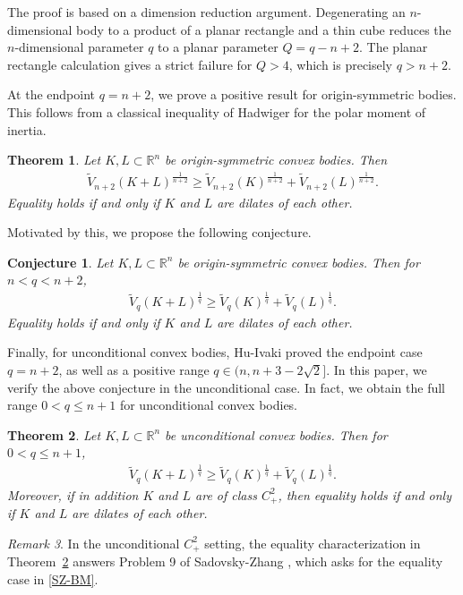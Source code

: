 \documentclass[12pt,leqno]{amsart}
\theoremstyle{plain} \newtheorem{thm}{Theorem}[section]
\theoremstyle{plain} \newtheorem{prop}[thm]{Proposition}
\theoremstyle{plain} \newtheorem{prob}[thm]{Problem}
\theoremstyle{definition} \newtheorem{defi}[thm]{Definition}
\theoremstyle{plain} \newtheorem{cor}[thm]{Corollary}
\theoremstyle{plain} \newtheorem{lem}[thm]{Lemma}
\theoremstyle{plain} \newtheorem{eg}{Example}[section]
\theoremstyle{remark} \newtheorem{rmk}[thm]{Remark}
\theoremstyle{plain} \newtheorem{conj}{Conjecture}
\numberwithin{equation}{section}
\newcommand{\bR}{\mathbb{R}}
\newcommand{\tV}{\widetilde V}
\begin{document}
The proof is based on a dimension reduction argument. Degenerating an $n$-dimensional body to a product of a planar rectangle and a thin cube reduces the $n$-dimensional parameter $q$ to a planar parameter $Q=q-n+2$. The planar rectangle calculation gives a strict failure for $Q>4$, which is precisely $q>n+2$.

At the endpoint $q=n+2$, we prove a positive result for origin-symmetric bodies. This follows from a classical inequality of Hadwiger \cite{Had56} for the polar moment of inertia.

\begin{thm}\label{thm-endpoint}
Let $K,L\subset \bR^n$ be origin-symmetric convex bodies. Then
\begin{align}\label{endpoint-BM}
    \tV_{n+2}(K+L)^{\frac1{n+2}}\geq \tV_{n+2}(K)^{\frac1{n+2}}+\tV_{n+2}(L)^{\frac1{n+2}}.
\end{align}
Equality holds if and only if $K$ and $L$ are dilates of each other.
\end{thm}

Motivated by this, we propose the following conjecture.

\begin{conj}\label{conj-sym-range}
Let $K,L\subset \bR^n$ be origin-symmetric convex bodies. Then for $n<q<n+2$,
\begin{align}
    \tV_q(K+L)^{\frac1q}\geq \tV_q(K)^{\frac1q}+\tV_q(L)^{\frac1q}.
\end{align}
Equality holds if and only if $K$ and $L$ are dilates of each other.
\end{conj}


Finally, for unconditional convex bodies, Hu-Ivaki \cite{HI26} proved the endpoint case \(q=n+2\), as well as a positive range \(q\in (n,n+3-2\sqrt{2}]\). In this paper, we verify the above conjecture in the unconditional case. In fact, we obtain the full range $0<q\le n+1$ for unconditional convex bodies.

\begin{thm}\label{thm-unconditional}
Let $K,L\subset \bR^n$ be unconditional convex bodies. Then for $0<q\leq n+1$,
\begin{align}\label{unc-BM}
    \tV_q(K+L)^{\frac1q}\geq \tV_q(K)^{\frac1q}+\tV_q(L)^{\frac1q}.
\end{align}
Moreover, if in addition $K$ and $L$ are of class $C^2_+$, then equality holds if and only if $K$ and $L$ are dilates of each other.
\end{thm}

\begin{rmk}
In the unconditional $C^2_+$ setting, the equality characterization in
Theorem~\ref{thm-unconditional} answers Problem 9 of Sadovsky-Zhang \cite{SZ25}, which asks for the equality case in \eqref{SZ-BM}. 
\end{rmk}
\end{document}
